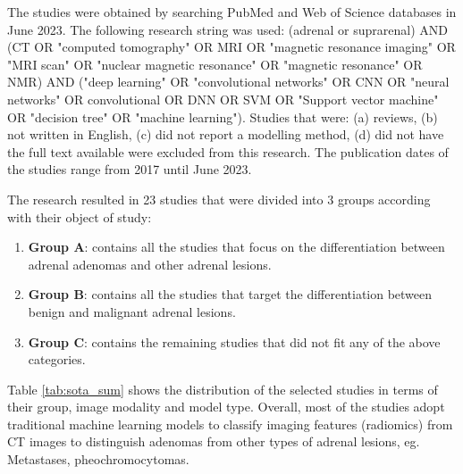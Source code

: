\documentclass[11pt]{article}
\begin{document}
The studies were obtained by searching PubMed and Web of Science databases in
June 2023. The following research string was used: (adrenal
or suprarenal) AND (CT OR "computed tomography" OR MRI OR "magnetic resonance
imaging" OR "MRI scan" OR "nuclear magnetic resonance" OR "magnetic resonance"
OR NMR) AND ("deep learning" OR "convolutional networks" OR CNN OR "neural
networks" OR convolutional OR DNN OR SVM OR "Support vector machine" OR
"decision tree" OR "machine learning"). Studies that were: (a) reviews, (b) not
written in English, (c) did not report a modelling method, (d) did not have the
full text available were excluded from this research. The publication dates of
the studies range from 2017 until June 2023.

The research resulted in 23 studies that were divided into 3 groups according with
their object of study:
\begin{enumerate}
    \item[] \textbf{Group A}: contains all the studies that focus on the
          differentiation between adrenal adenomas and other adrenal lesions.
    \item[] \textbf{Group B}: contains all the studies that target the
          differentiation between benign and malignant adrenal lesions.
    \item[] \textbf{Group C}: contains the remaining studies that did not fit
          any of the above categories.
\end{enumerate}
Table \ref{tab:sota_sum} shows the distribution of the selected studies in terms
of their group, image modality and model type. Overall, most of the studies
adopt traditional machine learning models to classify imaging features
(radiomics) from CT images to distinguish adenomas from other types of adrenal
lesions, eg. Metastases, pheochromocytomas.
\end{document}
